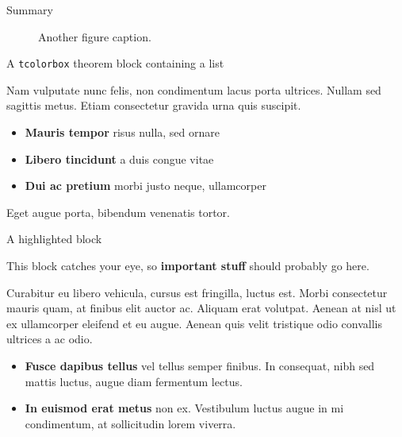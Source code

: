\documentclass[final]{beamer}
\newlength{\colwidth}
\begin{document}
\begin{frame}[t]
\begin{columns}[t]
\begin{column}{\colwidth}
\begin{exampleblock}{Summary}
        \begin{figure}
          \centering
          \caption{Another figure caption.}
        \end{figure}

      \end{exampleblock}

      \begin{thm}{A \texttt{tcolorbox} theorem block containing a list}{}

        Nam vulputate nunc felis, non condimentum lacus porta ultrices. Nullam sed
        sagittis metus. Etiam consectetur gravida urna quis suscipit.

        \begin{itemize}
          \item \textbf{Mauris tempor} risus nulla, sed ornare
          \item \textbf{Libero tincidunt} a duis congue vitae
          \item \textbf{Dui ac pretium} morbi justo neque, ullamcorper
        \end{itemize}

        Eget augue porta, bibendum venenatis tortor.

      \end{thm}

      \begin{alertblock}{A highlighted block}

        This block catches your eye, so \textbf{important stuff} should probably go
        here.

        Curabitur eu libero vehicula, cursus est fringilla, luctus est. Morbi
        consectetur mauris quam, at finibus elit auctor ac. Aliquam erat volutpat.
        Aenean at nisl ut ex ullamcorper eleifend et eu augue. Aenean quis velit
        tristique odio convallis ultrices a ac odio.

        \begin{itemize}
          \item \textbf{Fusce dapibus tellus} vel tellus semper finibus. In
          consequat, nibh sed mattis luctus, augue diam fermentum lectus.
          \item \textbf{In euismod erat metus} non ex. Vestibulum luctus augue in
          mi condimentum, at sollicitudin lorem viverra.
        \end{itemize}


\end{alertblock}
\end{column}
\end{columns}
\end{frame}
\end{document}
